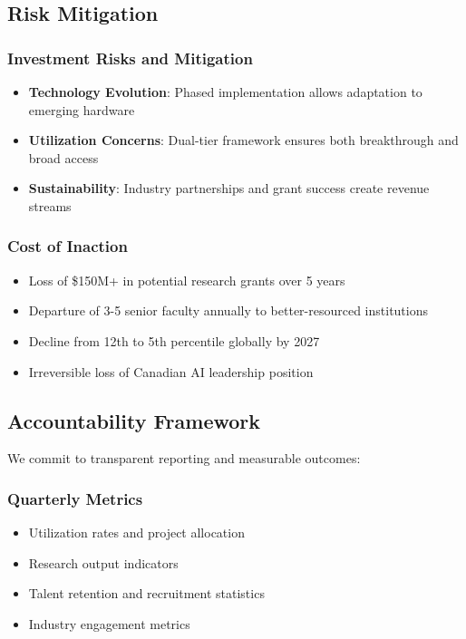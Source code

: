\subsection{Risk Mitigation}

\subsubsection{Investment Risks and Mitigation}
\begin{itemize}
\item \textbf{Technology Evolution}: Phased implementation allows adaptation to emerging hardware
\item \textbf{Utilization Concerns}: Dual-tier framework ensures both breakthrough and broad access
\item \textbf{Sustainability}: Industry partnerships and grant success create revenue streams
\end{itemize}

\subsubsection{Cost of Inaction}
\begin{itemize}
\item Loss of \$150M+ in potential research grants over 5 years
\item Departure of 3-5 senior faculty annually to better-resourced institutions
\item Decline from 12th to 5th percentile globally by 2027
\item Irreversible loss of Canadian AI leadership position
\end{itemize}

\subsection{Accountability Framework}

We commit to transparent reporting and measurable outcomes:

\subsubsection{Quarterly Metrics}
\begin{itemize}
\item Utilization rates and project allocation
\item Research output indicators
\item Talent retention and recruitment statistics
\item Industry engagement metrics
\end{itemize}

